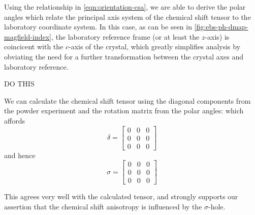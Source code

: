 \begin{refsection}
Using the relationship in \cref{eqn:orientation-csa}, we are able to derive the polar angles which relate the principal axis system of the chemical shift tensor to the laboratory coordinate system.
In this case, as can be seen in \cref{fig:ebs-ph-dmap-magfield-index}, the laboratory reference frame (or at least the $z$-axis) is coincicent with the $c$-axis of the crystal, which greatly simplifies analysis by obviating the need for a further transformation between the crystal axes and laboratory reference.

DO THIS

We can calculate the chemical shift tensor using the diagonal components from the powder experiment and the rotation matrix from the polar angles:
\fi
which affords
\begin{equation}
  \delta = \begin{bmatrix} 0 & 0 & 0 \\ 0 & 0 & 0 \\ 0 & 0 & 0 \end{bmatrix}
\end{equation}
and hence\begin{equation}
  \sigma = \begin{bmatrix} 0 & 0 & 0 \\ 0 & 0 & 0 \\ 0 & 0 & 0 \end{bmatrix}
\end{equation}

This agrees very well with the calculated tensor, and strongly supports our assertion that the chemical shift anisotropy is influenced by the $\sigma$-hole.


\end{refsection}
